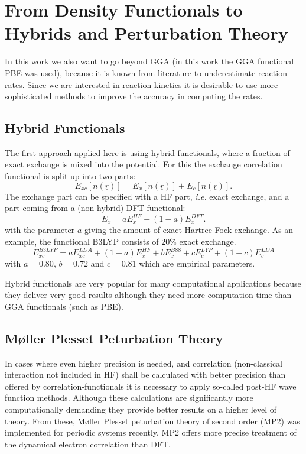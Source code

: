 \documentclass[11pt,DIV=13,BCOR=5mm,a4paper,headinclude]{scrbook}
\renewcommand{\vec}[1]{\underline{#1}}
\begin{document}
\section{From Density Functionals to Hybrids and Perturbation Theory}\label{theorybeyond}
In this work we also want to go beyond GGA (in this work the GGA functional PBE was used), because it is known from literature to underestimate reaction rates\cite{Zhao05}.
Since we are interested in reaction kinetics it is desirable to use more sophisticated methods to improve the accuracy in computing the rates.
\subsection{Hybrid Functionals}
The first approach applied here is using hybrid functionals, where a fraction of exact exchange is mixed into the potential.
For this the exchange correlation functional is split up into two parts:
\begin{equation}
 E_{xc}[n(\vec{r})]=  E_{x}[n(\vec{r})] + E_{c}[n(\vec{r})].
\end{equation}
The exchange part can be specified with a HF part, \textit{i.e.} exact exchange, and a part coming from a (non-hybrid) DFT functional:
\begin{equation}
 E_x = aE_x^{HF} + (1-a)E_x^{DFT}.
\end{equation}
with the parameter $a$ giving the amount of exact Hartree-Fock exchange.
As an example, the functional B3LYP consists of $20\%$ exact exchange\cite{Becke1993}.
\begin{equation}
 E_{xc}^{B3LYP}= aE_{xc}^{LDA} + (1-a)E_x^{HF} + bE_x^{B88} + cE_c^{LYP} + (1-c)E_c^{LDA}
\end{equation}
with $a=0.80$, $b=0.72$ and $c=0.81$ which are empirical parameters.


Hybrid functionals are very popular for many computational applications because they deliver very good results although they need more computation time than GGA functionals (such as PBE).

\subsection{M\o{}ller Plesset Peturbation Theory}
In cases where even higher precision is needed, and correlation (non-classical interaction not included in HF) shall be calculated with better precision than offered by correlation-functionals it is necessary to apply so-called post-HF wave function methods.
Although these calculations are significantly more computationally demanding they provide better results on a higher level of theory.
From these, M\o{}ller Plesset peturbation theory of second order (MP2)\cite{mollerplesset} was implemented for periodic systems recently.
MP2 offers more precise treatment of the dynamical electron correlation than DFT.
\end{document}
